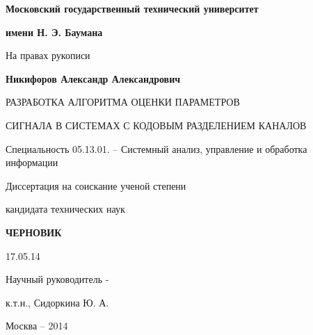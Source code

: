 \noindent\centerline{\bf{Московский государственный технический университет}}
\noindent\centerline{\bf{имени Н. Э. Баумана}}
\vspace{\baselineskip}
\vspace{\baselineskip}

\hfill На правах рукописи

\vspace{\baselineskip}
\vspace{\baselineskip}

\noindent\centerline{\bf{Никифоров Александр Александрович}}

\vspace{\baselineskip}
\vspace{\baselineskip}

\noindent\centerline{РАЗРАБОТКА АЛГОРИТМА ОЦЕНКИ ПАРАМЕТРОВ}
\noindent\centerline{СИГНАЛА В СИСТЕМАХ С КОДОВЫМ РАЗДЕЛЕНИЕМ КАНАЛОВ}

\vspace{\baselineskip}
\vspace{\baselineskip}

\noindent\centerline{Специальность 05.13.01. – Системный анализ, управление и обработка информации}

\vspace{\baselineskip}
\vspace{\baselineskip}

\noindent\centerline{Диссертация на соискание ученой степени}
\noindent\centerline{кандидата технических наук}


\vspace{\baselineskip}
\vspace{\baselineskip}
\noindent\centerline{\bf{ЧЕРНОВИК}}
\noindent\centerline{17.05.14}

\vspace{\baselineskip}
\vspace{\baselineskip}

\hfill{Научный руководитель -}

\hfill{к.т.н., Сидоркина Ю. А.}

\vfill
\noindent\centerline{Москва – 2014}

\newpage
